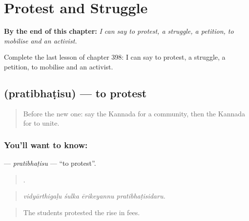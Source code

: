 
\chapter{Protest and Struggle}
\label{ch:ka-protest-and-struggle}

\begin{chapteropening}
\textbf{By the end of this chapter:} \emph{I can say to protest, a struggle, a petition, to mobilise and an activist.}

Complete the last lesson of chapter 398: I can say to protest, a struggle, a petition, to mobilise and an activist.
\end{chapteropening}

\section[\texorpdfstring{\kn{ಪ್ರತಿಭಟಿಸು} (pratibhaṭisu)}{ಪ್ರತಿಭಟಿಸು (pratibhaṭisu)}]{ (pratibhaṭisu) — to protest}

\label{lesson:KA-C398-pratibhatisu}



\begin{quote}
Before the new one: say the Kannada for a community, then the Kannada for to unite.
\end{quote}

\subsection*{You'll want to know: }
\textbf{} — \emph{pratibhaṭisu} — \textquotedblleft{}to protest\textquotedblright{}.

\begin{quote}
   .
\end{quote}

\begin{quote}
\emph{vidyārthigaḷu śulka ērikeyannu pratibhaṭisidaru.}
\end{quote}

\begin{quote}
The students protested the rise in fees.
\end{quote}

